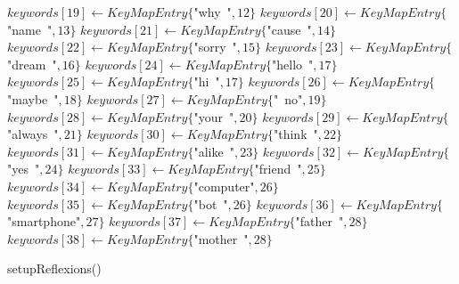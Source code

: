 \documentclass[a4paper,10pt]{article}
\begin{document}
\begin{function}
{  \(keywords[19]\leftarrow{}KeyMapEntry\{\)"{}why\ "{}\(,12\}\)\;
  \(keywords[20]\leftarrow{}KeyMapEntry\{\)"{}name\ "{}\(,13\}\)\;
  \(keywords[21]\leftarrow{}KeyMapEntry\{\)"{}cause\ "{}\(,14\}\)\;
  \(keywords[22]\leftarrow{}KeyMapEntry\{\)"{}sorry\ "{}\(,15\}\)\;
  \(keywords[23]\leftarrow{}KeyMapEntry\{\)"{}dream\ "{}\(,16\}\)\;
  \(keywords[24]\leftarrow{}KeyMapEntry\{\)"{}hello\ "{}\(,17\}\)\;
  \(keywords[25]\leftarrow{}KeyMapEntry\{\)"{}hi\ "{}\(,17\}\)\;
  \(keywords[26]\leftarrow{}KeyMapEntry\{\)"{}maybe\ "{}\(,18\}\)\;
  \(keywords[27]\leftarrow{}KeyMapEntry\{\)"{}\ no"{}\(,19\}\)\;
  \(keywords[28]\leftarrow{}KeyMapEntry\{\)"{}your\ "{}\(,20\}\)\;
  \(keywords[29]\leftarrow{}KeyMapEntry\{\)"{}always\ "{}\(,21\}\)\;
  \(keywords[30]\leftarrow{}KeyMapEntry\{\)"{}think\ "{}\(,22\}\)\;
  \(keywords[31]\leftarrow{}KeyMapEntry\{\)"{}alike\ "{}\(,23\}\)\;
  \(keywords[32]\leftarrow{}KeyMapEntry\{\)"{}yes\ "{}\(,24\}\)\;
  \(keywords[33]\leftarrow{}KeyMapEntry\{\)"{}friend\ "{}\(,25\}\)\;
  \(keywords[34]\leftarrow{}KeyMapEntry\{\)"{}computer"{}\(,26\}\)\;
  \(keywords[35]\leftarrow{}KeyMapEntry\{\)"{}bot\ "{}\(,26\}\)\;
  \(keywords[36]\leftarrow{}KeyMapEntry\{\)"{}smartphone"{}\(,27\}\)\;
  \(keywords[37]\leftarrow{}KeyMapEntry\{\)"{}father\ "{}\(,28\}\)\;
  \(keywords[38]\leftarrow{}KeyMapEntry\{\)"{}mother\ "{}\(,28\}\)\;
}
\end{function}


\begin{function}
\caption{setupReflexions()}
\end{function}
\end{document}
